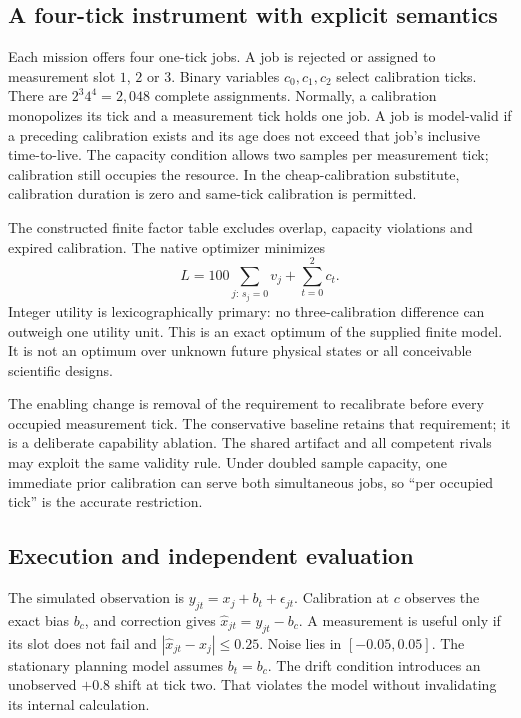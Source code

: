 \documentclass[11pt]{article}
\begin{document}
\subsection{A four-tick instrument with explicit semantics}
Each mission offers four one-tick jobs. A job is rejected or assigned to measurement slot $1$, $2$ or $3$. Binary variables $c_0,c_1,c_2$ select calibration ticks. There are $2^3 4^4=2{,}048$ complete assignments. Normally, a calibration monopolizes its tick and a measurement tick holds one job. A job is model-valid if a preceding calibration exists and its age does not exceed that job's inclusive time-to-live. The capacity condition allows two samples per measurement tick; calibration still occupies the resource. In the cheap-calibration substitute, calibration duration is zero and same-tick calibration is permitted.

The constructed finite factor table excludes overlap, capacity violations and expired calibration. The native optimizer minimizes
\begin{equation}
L=100\sum_{j:\,s_j=0}v_j+\sum_{t=0}^{2}c_t.
\end{equation}
Integer utility is lexicographically primary: no three-calibration difference can outweigh one utility unit. This is an exact optimum of the supplied finite model. It is not an optimum over unknown future physical states or all conceivable scientific designs.

The enabling change is removal of the requirement to recalibrate before every occupied measurement tick. The conservative baseline retains that requirement; it is a deliberate capability ablation. The shared artifact and all competent rivals may exploit the same validity rule. Under doubled sample capacity, one immediate prior calibration can serve both simultaneous jobs, so ``per occupied tick'' is the accurate restriction.

\subsection{Execution and independent evaluation}
The simulated observation is $y_{jt}=x_j+b_t+\epsilon_{jt}$. Calibration at $c$ observes the exact bias $b_c$, and correction gives $\hat x_{jt}=y_{jt}-b_c$. A measurement is useful only if its slot does not fail and $|\hat x_{jt}-x_j|\leq0.25$. Noise lies in $[-0.05,0.05]$. The stationary planning model assumes $b_t=b_c$. The drift condition introduces an unobserved $+0.8$ shift at tick two. That violates the model without invalidating its internal calculation.
\end{document}
